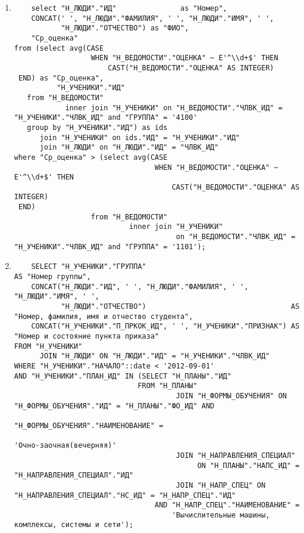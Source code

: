 \documentclass{article}
\begin{document}
\begin{enumerate}
  \item \begin{lstlisting}
    select "Н_ЛЮДИ"."ИД"               as "Номер",
    CONCAT(' ', "Н_ЛЮДИ"."ФАМИЛИЯ", ' ', "Н_ЛЮДИ"."ИМЯ", ' ',
           "Н_ЛЮДИ"."ОТЧЕСТВО") as "ФИО",
    "Ср_оценка"
from (select avg(CASE
                  WHEN "Н_ВЕДОМОСТИ"."ОЦЕНКА" ~ E'^\\d+$' THEN
                      CAST("Н_ВЕДОМОСТИ"."ОЦЕНКА" AS INTEGER)
 END) as "Ср_оценка",
          "Н_УЧЕНИКИ"."ИД"
   from "Н_ВЕДОМОСТИ"
            inner join "Н_УЧЕНИКИ" on "Н_ВЕДОМОСТИ"."ЧЛВК_ИД" = "Н_УЧЕНИКИ"."ЧЛВК_ИД" and "ГРУППА" = '4100'
   group by "Н_УЧЕНИКИ"."ИД") as ids
      join "Н_УЧЕНИКИ" on ids."ИД" = "Н_УЧЕНИКИ"."ИД"
      join "Н_ЛЮДИ" on "Н_ЛЮДИ"."ИД" = "ЧЛВК_ИД"
where "Ср_оценка" > (select avg(CASE
                                 WHEN "Н_ВЕДОМОСТИ"."ОЦЕНКА" ~ E'^\\d+$' THEN
                                     CAST("Н_ВЕДОМОСТИ"."ОЦЕНКА" AS INTEGER)
 END)
                  from "Н_ВЕДОМОСТИ"
                           inner join "Н_УЧЕНИКИ"
                                      on "Н_ВЕДОМОСТИ"."ЧЛВК_ИД" = "Н_УЧЕНИКИ"."ЧЛВК_ИД" and "ГРУППА" = '1101');
\end{lstlisting}
        
        
  \item \begin{lstlisting}
    SELECT "Н_УЧЕНИКИ"."ГРУППА"                                         AS "Номер группы",
    CONCAT("Н_ЛЮДИ"."ИД", ' ', "Н_ЛЮДИ"."ФАМИЛИЯ", ' ', "Н_ЛЮДИ"."ИМЯ", ' ',
           "Н_ЛЮДИ"."ОТЧЕСТВО")                                  AS "Номер, фамилия, имя и отчество студента",
    CONCAT("Н_УЧЕНИКИ"."П_ПРКОК_ИД", ' ', "Н_УЧЕНИКИ"."ПРИЗНАК") AS "Номер и состояние пункта приказа"
FROM "Н_УЧЕНИКИ"
      JOIN "Н_ЛЮДИ" ON "Н_ЛЮДИ"."ИД" = "Н_УЧЕНИКИ"."ЧЛВК_ИД"
WHERE "Н_УЧЕНИКИ"."НАЧАЛО"::date < '2012-09-01'
AND "Н_УЧЕНИКИ"."ПЛАН_ИД" IN (SELECT "Н_ПЛАНЫ"."ИД"
                             FROM "Н_ПЛАНЫ"
                                      JOIN "Н_ФОРМЫ_ОБУЧЕНИЯ" ON "Н_ФОРМЫ_ОБУЧЕНИЯ"."ИД" = "Н_ПЛАНЫ"."ФО_ИД" AND
                                                                 "Н_ФОРМЫ_ОБУЧЕНИЯ"."НАИМЕНОВАНИЕ" =
                                                                 'Очно-заочная(вечерняя)'
                                      JOIN "Н_НАПРАВЛЕНИЯ_СПЕЦИАЛ"
                                           ON "Н_ПЛАНЫ"."НАПС_ИД" = "Н_НАПРАВЛЕНИЯ_СПЕЦИАЛ"."ИД"
                                      JOIN "Н_НАПР_СПЕЦ" ON "Н_НАПРАВЛЕНИЯ_СПЕЦИАЛ"."НС_ИД" = "Н_НАПР_СПЕЦ"."ИД"
                                 AND "Н_НАПР_СПЕЦ"."НАИМЕНОВАНИЕ" =
                                     'Вычислительные машины, комплексы, системы и сети');
\end{lstlisting}
        

\end{enumerate}
\end{document}
